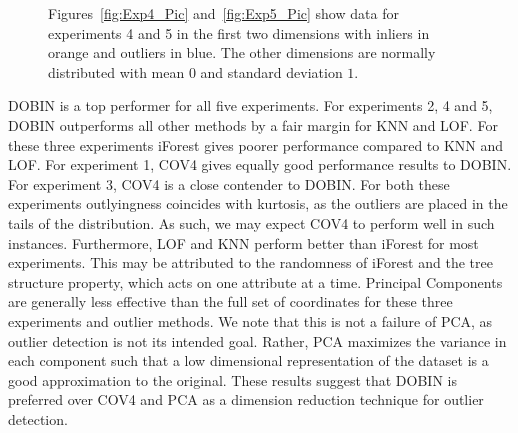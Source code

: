 \documentclass[letter,12pt]{article}
\begin{document}
\begin{figure}
   \centering
 	\caption{\color{blue} Figures~\ref{fig:Exp4_Pic} and~\ref{fig:Exp5_Pic} show data for experiments 4 and 5 in the first two dimensions with inliers in orange and outliers in blue. The other dimensions are normally distributed with mean $0$ and standard deviation $1$.  }
\end{figure}

{\color{blue} DOBIN is a top performer for all five experiments. For experiments 2, 4 and 5, DOBIN outperforms all other methods by a fair margin for KNN and LOF. For these three experiments iForest gives poorer performance compared to KNN and LOF.  For experiment 1, COV4 gives equally good performance results to DOBIN. For experiment 3,  COV4 is a close contender to DOBIN. For both these experiments outlyingness coincides with kurtosis, as the outliers are placed in the tails of the distribution. As such, we may expect COV4 to perform well in such instances.  Furthermore, LOF and KNN perform better than iForest for most experiments. This may be attributed to the randomness of iForest and the tree structure property, which acts on one attribute at a time. }
Principal Components are generally less effective than the full set of coordinates for these three experiments and outlier methods. We note that this is not a failure of PCA, as outlier detection is not its intended goal. Rather, PCA maximizes the variance in each component such that a low dimensional representation of the dataset is a good approximation to the original. These results suggest that DOBIN is preferred over COV4 and PCA as a dimension reduction technique for outlier detection. %
\end{document}
